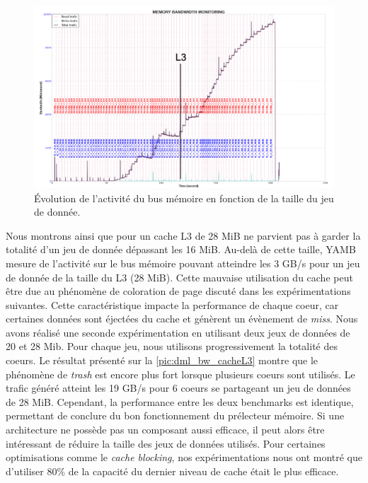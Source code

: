          \begin{figure}
        \center
        \includegraphics[width=14cm]{images/dml_L3_sharing.png}
        \caption{\label{pic:dml_L3_sharing} Évolution de l'activité du bus mémoire en fonction de la taille du jeu de donnée.}
        \end{figure}
        
        Nous montrons ainsi que pour un cache L3 de 28 MiB ne parvient pas à garder la totalité d'un jeu de donnée dépassant les 16 MiB. Au-delà de cette taille, YAMB mesure de l'activité sur le bus mémoire pouvant atteindre les 3 GB/s pour un jeu de donnée de la taille du L3 (28 MiB). Cette mauvaise utilisation du cache peut être due au phénomène de coloration de page discuté dans les expérimentations suivantes. Cette caractéristique impacte la performance de chaque coeur, car certaines données sont éjectées du cache et génèrent un évènement de \textit{miss}. Nous avons réalisé une seconde expérimentation en utilisant deux jeux de données de 20 et 28 Mib. Pour chaque jeu, nous utilisons progressivement la totalité des coeurs. Le résultat présenté sur la \autoref{pic:dml_bw_cacheL3} montre que le phénomène de \textit{trash} est encore plus fort lorsque plusieurs coeurs sont utilisés. Le trafic généré atteint les 19 GB/s pour 6 coeurs se partageant un jeu de données de 28 MiB. Cependant, la performance entre les deux benchmarks est identique, permettant de conclure du bon fonctionnement du prélecteur mémoire. Si une architecture ne possède pas un composant aussi efficace, il peut alors être intéressant de réduire la taille des jeux de données utilisés. Pour certaines optimisations comme le \textit{cache blocking}, nos expérimentations nous ont montré que d’utiliser 80\% de la capacité du dernier niveau de cache était le plus efficace.
        
